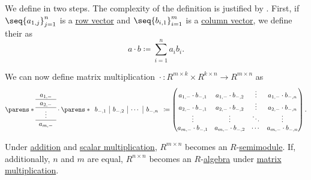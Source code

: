 \begin{proposition}
\begin{thmenum}
     We define  in two steps. The complexity of the definition is justified by . First, if \( \seq{ a_{1,j} }_{j=1}^n \) is a \hyperref[def:array/row_vector]{row vector} and \( \seq{ b_{i,1} }_{i=1}^m \) is a \hyperref[def:array/column_vector]{column vector}, we define their  as
    \begin{equation*}
      a \cdot b \coloneqq \sum_{i=1}^n a_i b_i.
    \end{equation*}

    We can now define matrix multiplication \( {}\cdot{}: R^{m \times k} \times R^{k \times n} \to R^{m \times n} \) as
    \begin{equation*}
     \parens*
       {
         \begin{array}{c}
            a_{1,-} \\
            \hline
            a_{2,-} \\
            \hline
            \vdots \\
            \hline
            a_{m,-}
          \end{array}
        }
      \cdot
      \parens*
        {
          \begin{array}{c|c|c|c}
            b_{-,1} & b_{-,2} & \cdots & b_{-,n}
          \end{array}
        }
      \coloneqq
      \begin{pmatrix}
        a_{1,-} \cdot b_{-,1} & a_{1,-} \cdot b_{-,2} & \vdots & a_{1,-} \cdot b_{-,n} \\
        a_{2,-} \cdot b_{-,1} & a_{2,-} \cdot b_{-,2} & \vdots & a_{2,-} \cdot b_{-,n} \\
        \vdots                & \vdots                & \ddots & \vdots                \\
        a_{m,-} \cdot b_{-,1} & a_{m,-} \cdot b_{-,2} & \cdots & a_{m,-} \cdot b_{-,n}
      \end{pmatrix}.
    \end{equation*}
  \end{thmenum}

  Under \hyperref[def:matrix_algebra/addition]{addition} and \hyperref[def:matrix_algebra/scalar_multiplication]{scalar multiplication}, \( R^{m \times n} \) becomes an \( R \)-\hyperref[def:semimodule]{semimodule}. If, additionally, \( n \) and \( m \) are equal, \( R^{n \times n} \) becomes an \( R \)-\hyperref[def:algebra_over_semiring]{algebra} under \hyperref[def:matrix_algebra/matrix_multiplication]{matrix multiplication}.
\end{proposition}
